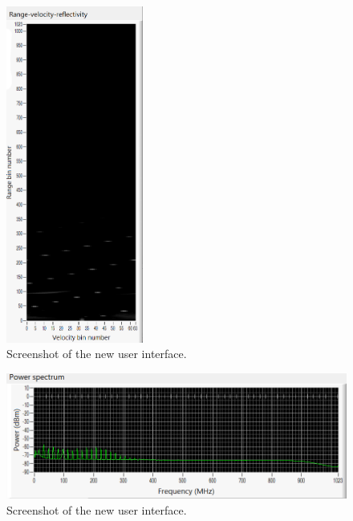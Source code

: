 \documentclass{article}
\begin{document}
\begin{figure}
	\centering
	\includegraphics[width=0.4\textwidth]{working-cloud_range-doppler}
	\caption{Screenshot of the new user interface.}
	\label{fig:WorkingCloudRangeDoppler}
\end{figure}

\begin{figure}
	\centering
	\includegraphics[width=\textwidth]{working-cloud_power-spect}
	\caption{Screenshot of the new user interface.}
	\label{fig:WorkingCloudPowerSpectrum}
\end{figure}
\end{document}
